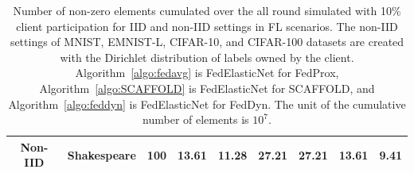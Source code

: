 \documentclass{article} %
\begin{document}
\begin{table}[ht!]
{\begin{tabular}{|c|c|c|cc|cc|cc|}
\textbf{Non-IID} &
  Shakespeare &   100 &   {13.61} &   \textbf{11.28} &   {27.21} &   \textbf{27.21} &   {13.61} &   \textbf{9.41} \\ \hline
\end{tabular}%
}
\caption{Number of non-zero elements cumulated over the all round simulated with 10$\%$ client participation for IID and non-IID settings in FL scenarios. The non-IID settings of MNIST, EMNIST-L, CIFAR-10, and CIFAR-100 datasets are created with the Dirichlet distribution of labels owned by the client. Algorithm~\ref{algo:fedavg} is FedElasticNet for FedProx, Algorithm~\ref{algo:SCAFFOLD} is FedElasticNet for SCAFFOLD, and Algorithm~\ref{algo:feddyn} is FedElasticNet for FedDyn. The unit of the cumulative number of elements is $10^{7}$.}
\label{tab:nonzero}
\end{table}
\end{document}
